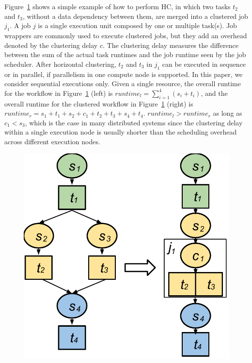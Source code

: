 Figure~\ref{fig:model_hc} shows a simple example of how to perform HC, in which two tasks $t_2$ and $t_3$, without a data dependency between them, are merged into a clustered job $j_1$. A job $j$ is a single execution unit composed by one or multiple task(s). Job wrappers are commonly used to execute clustered jobs, but they add an overhead denoted by the clustering delay $c$. The clustering delay measures the difference between the sum of the actual task runtimes and the job runtime seen by the job scheduler. 
After horizontal clustering, $t_2$ and $t_3$ in $j_1$ can be executed in sequence or in parallel, if parallelism in one compute node is supported. In this paper, we consider sequential executions only. Given a single resource, the overall runtime for the workflow in Figure~\ref{fig:model_hc} (left) is $runtime_l= \sum_{i=1}^{4}(s_i+t_i)$, and the overall runtime for the clustered workflow in Figure~\ref{fig:model_hc} (right) is $runtime_r=s_1+t_1+s_2+c_1+t_2+t_3+s_4+t_4$.  $runtime_l > runtime_r$ as long as $c_1 < s_3$, which is the case in many distributed systems since the clustering delay within a single execution node is usually shorter than the scheduling overhead across different execution nodes. 

\begin{figure}[!htb]
\centering
 \includegraphics[width=0.55\linewidth]{figures/balance/figure3.pdf}
  \label{fig:model_hc}
\end{figure}

